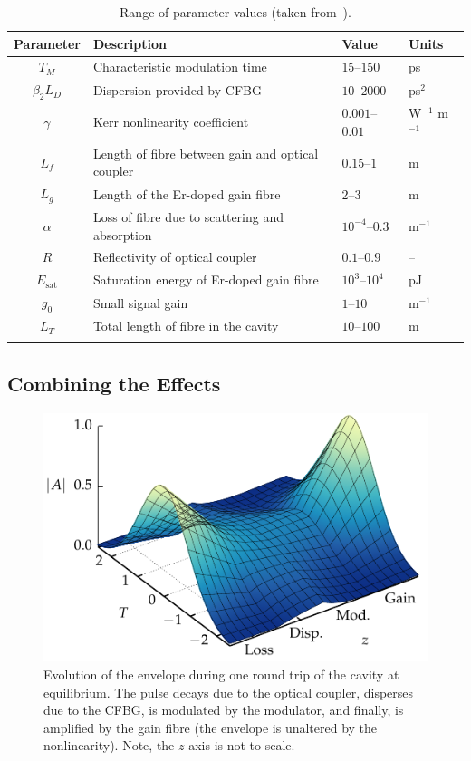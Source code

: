 \documentclass[9pt,twocolumn,twoside]{osajnl}
\newcommand{\Es}{E_{\textrm{sat}}} %
\begin{document}
\begin{table}[tbp]
	\centering
	\caption{Range of parameter values (taken from~\cite{agrawal2013, burgoyne2014, burgoyneemail, tamura1996, usechak2005}).}
 	\label{tab:values}
 	\begin{tabular}{clll}
		\hline
		Parameter & Description & Value & Units \\
		\hline\noalign{\smallskip}
		$T_M$ & Characteristic modulation time & $15$--$150$ & ps \\
		$\beta_2 L_D$ & Dispersion provided by CFBG & $10$--$2000$ & ps$^2$ \\
		$\gamma$ & Kerr nonlinearity coefficient & $0.001$--$0.01$ & W$^{-1}$ m$^{-1}$ \\
		$L_f$ & Length of fibre between gain and optical coupler & $0.15$--$1$ & m \\
		$L_g$ & Length of the Er-doped gain fibre & $2$--$3$ & m \\
		$\alpha$ & Loss of fibre due to scattering and absorption & $10^{-4}$--$0.3$ & m$^{-1}$ \\
		$R$ & Reflectivity of optical coupler & $0.1$--$0.9$ & -- \\
		$\Es$ & Saturation energy of Er-doped gain fibre & $10^3$--$10^4$ & pJ \\
		$g_0$ & Small signal gain &  $1$--$10$ & m$^{-1}$ \\
		$L_T$ & Total length of fibre in the cavity & $10$--$100$ & m \\
		\noalign{\smallskip}\hline
	\end{tabular}
\end{table}

\subsection{Combining the Effects}
\label{sec:effects}

\begin{figure}[tbp]
	\centering
	\includegraphics{Figures/Evo}
	\caption{Evolution of the envelope during one round trip of the cavity at equilibrium. The pulse decays due to the optical coupler, disperses due to the CFBG, is modulated by the modulator, and finally, is amplified by the gain fibre (the envelope is unaltered by the nonlinearity). Note, the $z$ axis is not to scale.}
	\label{fig:cavityevo}
\end{figure}
\end{document}
